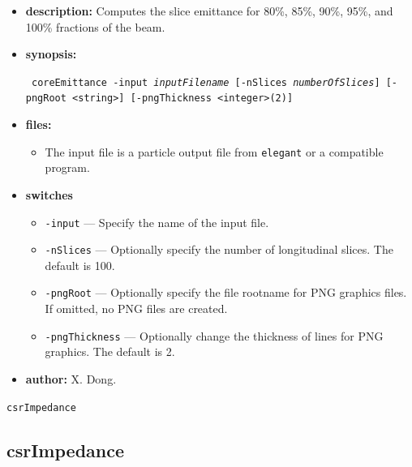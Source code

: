 \documentclass[11pt]{article}
\begin{document}
\begin{itemize}
\item {\bf description:} Computes the slice emittance for 80\%, 85\%, 90\%, 95\%, and 100\% fractions of the beam.

\item {\bf synopsis:}
\begin{flushleft}{\tt 
coreEmittance -input {\em inputFilename} [-nSlices {\em numberOfSlices}] [-pngRoot <string>] [-pngThickness <integer>(2)]
}
\end{flushleft}

\item {\bf files:}
\begin{itemize}
\item The input file is a particle output file from {\tt elegant} or a compatible program.
\end{itemize}

\item {\bf switches}
\begin{itemize}
\item \verb|-input| --- Specify the name of the input file.
\item \verb|-nSlices| --- Optionally specify the number of longitudinal slices. The default is 100.
\item \verb|-pngRoot| --- Optionally specify the file rootname for PNG graphics files. If omitted, no PNG files are created.
\item \verb|-pngThickness| --- Optionally change the thickness of lines for PNG graphics.  The default is 2.
\end{itemize}

\item {\bf author:} X. Dong.

\end{itemize}

\newpage
\begin{center}{\Large\verb|csrImpedance|}\end{center}
\subsection{csrImpedance}
\end{document}
